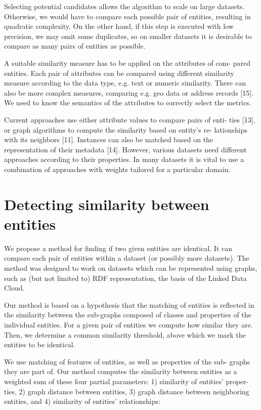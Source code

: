 \documentclass{llncs}
\begin{document}
Selecting potential candidates allows the algorithm to scale on large datasets.
Otherwise, we would have to compare each possible pair of entities, resulting
in quadratic complexity. On the other hand, if this step is executed with low
precision, we may omit some duplicates, so on smaller datasets it is desirable to
compare as many pairs of entities as possible.

A suitable similarity measure has to be applied on the attributes of com-
pared entities. Each pair of attributes can be compared using different similarity
measure according to the data type, e.g. text or numeric similarity. There can
also be more complex measures, comparing e.g. geo data or address records [15].
We need to know the semantics of the attributes to correctly select the metrics.

Current approaches use either attribute values to compare pairs of enti-
ties [13], or graph algorithms to compute the similarity based on entity's re-
lationships with its neighbors [11]. Instances can also be matched based on the
representation of their metadata [14]. However, various datasets need different
approaches according to their properties. In many datasets it is vital to use a
combination of approaches with weights tailored for a particular domain.

\section{Detecting similarity between entities}

We propose a method for finding if two given entities are identical. It can compare
each pair of entities within a dataset (or possibly more datasets). The method
was designed to work on datasets which can be represented using graphs, such
as (but not limited to) RDF representation, the basis of the Linked Data Cloud.

Our method is based on a hypothesis that the matching of entities is reflected
in the similarity between the sub-graphs composed of classes and properties of
the individual entities. For a given pair of entities we compute how similar they
are. Then, we determine a common similarity threshold, above which we mark
the entities to be identical.

We use matching of features of entities, as well as properties of the sub-
graphs they are part of. Our method computes the similarity between entities as
a weighted sum of these four partial parameters: 1) similarity of entities' proper-
ties, 2) graph distance between entities, 3) graph distance between neighboring
entities, and 4) similarity of entities' relationships:\\
\end{document}
